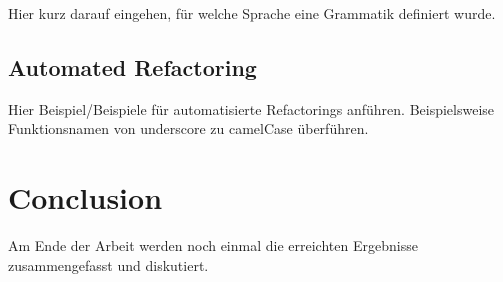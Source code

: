 Hier kurz darauf eingehen, für welche Sprache eine Grammatik definiert wurde.

\subsection{Automated Refactoring}

Hier Beispiel/Beispiele für automatisierte Refactorings anführen. Beispielsweise Funktionsnamen von underscore zu camelCase überführen.

\section{Conclusion}

Am Ende der Arbeit werden noch einmal die erreichten Ergebnisse
zusammengefasst und diskutiert.
